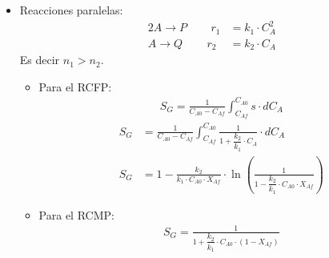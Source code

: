 \begin{enumerate}[label={\alph*)}]
{\begin{itemize}
			            Es decir $n_1 < n_2$
			            \begin{itemize}
				            \item Para el RCFP:
				                  \begin{align*}
					                  S_G = \frac{1}{C_{A0}-C_{Af}}\int_{C_{Af}}^{C_{A0}} \underbrace{s}_{\frac{r_1}{r_1+r_2}} \cdot dC_A
				                  \end{align*}
				                  \begin{align*}
					                  S_G & = \frac{1}{C_{A0}-C_{Af}}\int_{C_{Af}}^{C_{A0}}\frac{1}{1+\dfrac{k_2}{k_1}\cdot C_A} \cdot dC_A                                                          \\[6pt]
					                  S_G & = \frac{k_1}{k_2 \cdot C_{A0} \cdot X_{Af}}\cdot \ln \left( \frac{1+\dfrac{k_2}{k_1}\cdot C_{A0}}{1+\dfrac{k_2}{k_1}\cdot C_{A0}\cdot (1-X_{Af}} \right)
				                  \end{align*}
				            \item Para el RCMP:
				                  \begin{align*}
					                  S_G = \frac{1}{1+\dfrac{k_2}{k_1}\cdot C_{A0}\cdot (1-X_{Af})}
				                  \end{align*}
			            \end{itemize}
			      \item Reacciones paralelas:
			            \begin{align*}
				            2A \rightarrow P \quad \, \quad r_1 & = k_1 \cdot C_A^2 \\
				            A \rightarrow Q \quad \, \quad r_2  & = k_2 \cdot C_A
			            \end{align*}
			            Es decir $n_1 > n_2$.
			            \begin{itemize}
				            \item Para el RCFP:
				                  \begin{align*}
					                  S_G = \frac{1}{C_{A0}-C_{Af}}\int_{C_{Af}}^{C_{A0}} s \cdot dC_A
				                  \end{align*}
				                  \begin{align*}
					                  S_G & = \frac{1}{C_{A0}-C_{Af}}\int_{C_{Af}}^{C_{A0}}\frac{1}{1+\dfrac{k_2}{k_1}\cdot C_A} \cdot dC_A                            \\[6pt]
					                  S_G & = 1- \frac{k_2}{k_1\cdot C_{A0}\cdot X_{Af}} \cdot \ln \left( \frac{1}{1-\dfrac{k_2}{k_1}\cdot C_{A0}\cdot X_{Af}} \right)
				                  \end{align*}
				            \item Para el RCMP:
				                  \begin{align*}
					                  S_G = \frac{1}{1+\dfrac{k_2}{k_1}\cdot C_{A0}\cdot(1- X_{Af})}
				                  \end{align*}
			            \end{itemize}


\end{itemize}}
\end{enumerate}
